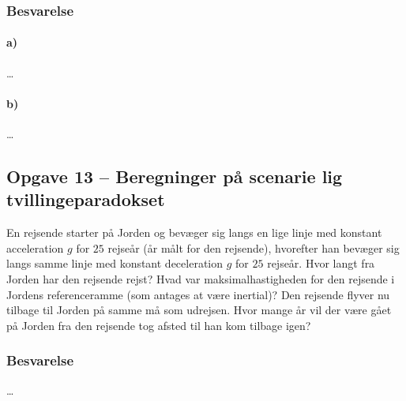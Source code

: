 \documentclass[../main.tex]{subfiles}
\begin{document}

\subsubsection{Besvarelse}


\paragraph{a)}

\ldots



\paragraph{b)}

\ldots




\subsection{Opgave 13 -- Beregninger på scenarie lig tvillingeparadokset}
\setcounter{subsection}{13}
\setcounter{equation}{0}

En rejsende starter på Jorden og bevæger sig langs en lige linje med konstant acceleration $g$ for $25$ rejseår (år målt for den rejsende), hvorefter han bevæger sig langs samme linje med konstant deceleration $g$ for $25$ rejseår. Hvor langt fra Jorden har den rejsende rejst? Hvad var maksimalhastigheden for den rejsende i Jordens referenceramme (som antages at være inertial)? Den rejsende flyver nu tilbage til Jorden på samme må som udrejsen. Hvor mange år vil der være gået på Jorden fra den rejsende tog afsted til han kom tilbage igen?


\subsubsection{Besvarelse}

\ldots



\end{document}
